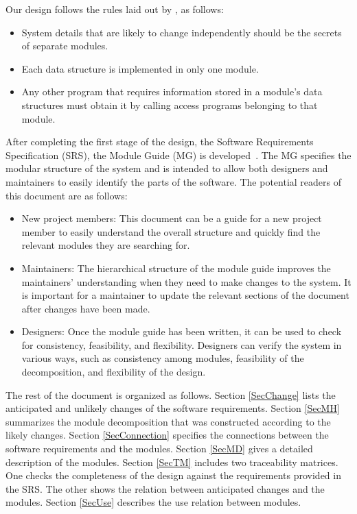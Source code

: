 \documentclass[12pt, titlepage]{article}
\begin{document}
Our design follows the rules laid out by \citet{ParnasEtAl1984}, as follows:
\begin{itemize}
  \item System details that are likely to change independently should be the secrets of
        separate modules.
  \item Each data structure is implemented in only one module.
  \item Any other program that requires information stored in a module's data
        structures must obtain it by calling access programs belonging to that module.
\end{itemize}

After completing the first stage of the design, the Software Requirements
Specification (SRS), the Module Guide (MG) is developed~\citep{ParnasEtAl1984}.
The MG specifies the modular structure of the system and is intended to allow
both designers and maintainers to easily identify the parts of the software.
The potential readers of this document are as follows:

\begin{itemize}
  \item New project members: This document can be a guide for a new project member to
        easily understand the overall structure and quickly find the relevant modules
        they are searching for.
  \item Maintainers: The hierarchical structure of the module guide improves the
        maintainers' understanding when they need to make changes to the system. It is
        important for a maintainer to update the relevant sections of the document
        after changes have been made.
  \item Designers: Once the module guide has been written, it can be used to check for
        consistency, feasibility, and flexibility. Designers can verify the system in
        various ways, such as consistency among modules, feasibility of the
        decomposition, and flexibility of the design.
\end{itemize}

The rest of the document is organized as follows. Section \ref{SecChange} lists
the anticipated and unlikely changes of the software requirements. Section
\ref{SecMH} summarizes the module decomposition that was constructed according
to the likely changes. Section \ref{SecConnection} specifies the connections
between the software requirements and the modules. Section \ref{SecMD} gives a
detailed description of the modules. Section \ref{SecTM} includes two
traceability matrices. One checks the completeness of the design against the
requirements provided in the SRS. The other shows the relation between
anticipated changes and the modules. Section \ref{SecUse} describes the use
relation between modules.
\end{document}
